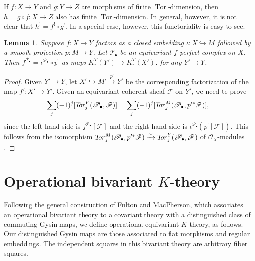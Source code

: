 \documentclass[11pt]{amsart}
\newtheorem{lemma}[theorem]{Lemma}
\theoremstyle{definition}
\begin{document}
If $f\colon X \to Y$ and $g\colon Y \to Z$ are morphisms of finite $\operatorname{Tor}$-dimension, then $h = g\circ f\colon X \to Z$ also has finite $\operatorname{Tor}$-dimension.  In general, however, it is not clear that $h^! = f^! \circ g^!$.  In a special case, however, this functoriality is easy to see.

\begin{lemma}\label{l.functorial}
Suppose $f\colon X \to Y$ factors as a closed embedding $\iota\colon X \hookrightarrow M$ followed by a smooth projection $p\colon M \to Y$.  Let ${\mathscr{P}}_\bullet$ be an equivariant $f$-perfect complex on $X$.  Then $f^{{\mathscr{P}}_\bullet} = \iota^{{\mathscr{P}}_\bullet} \circ p^!$ as maps $K^T_\circ(Y') \to K^T_\circ(X')$, for any $Y' \to Y$.
\end{lemma}

\begin{proof}
Given $Y' \to Y$, let $X' \hookrightarrow M' \xrightarrow{p'} Y'$ be the corresponding factorization of the map $f'\colon X' \to Y'$.  Given an equivariant coherent sheaf ${\mathscr{F}}$ on $Y'$, we need to prove
\[
  \sum_j (-1)^j [{T\hspace{-.6ex}or}^Y_j({\mathscr{P}}_\bullet,{\mathscr{F}})] = \sum_j (-1)^j [{T\hspace{-.6ex}or}^M_j({\mathscr{P}}_\bullet,p'^*{\mathscr{F}})],
\]
since the left-hand side is $f^{{\mathscr{P}}_\bullet}[{\mathscr{F}}]$ and the right-hand side is $\iota^{{\mathscr{P}}_\bullet}(p^![{\mathscr{F}}])$.  This follows from the isomorphism ${T\hspace{-.6ex}or}^M_j({\mathscr{P}}_\bullet,p'^*{\mathscr{F}}) \xrightarrow{\sim} {T\hspace{-.6ex}or}^Y_j({\mathscr{P}}_\bullet,{\mathscr{F}})$ of ${\mathcal{O}}_X$-modules \cite[Lemma 1.5.1]{ks}.
\end{proof}

\section{Operational bivariant $K$-theory}\label{s:opk}

Following the general construction of Fulton and MacPherson, which associates an operational bivariant theory to a covariant theory with a distinguished class of commuting Gysin maps, we define operational equivariant $K$-theory, as follows.  Our distinguished Gysin maps are those associated to flat morphisms and regular embeddings.  The independent squares in this bivariant theory are arbitrary fiber squares. 
\end{document}
